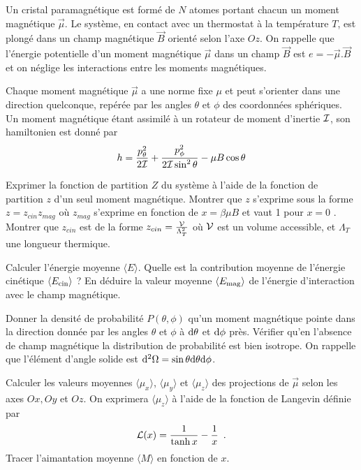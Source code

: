 Un cristal paramagnétique est formé de $N$ atomes portant chacun un moment magnétique $\overrightarrow{\mu}$. Le système, en contact avec un thermostat à la température $T$, est plongé dans un champ magnétique $\overrightarrow{B}$ orienté selon l'axe $Oz$.  On rappelle que l'énergie potentielle d'un moment magnétique $\overrightarrow{\mu}$ dans un champ $\overrightarrow{B}$ est $e=-\overrightarrow{\mu}.\overrightarrow{B}$ et on néglige les interactions entre les moments magnétiques.

\medskip


Chaque moment magnétique $\overrightarrow{\mu}$ a une norme fixe $\mu$ et peut s'orienter dans une direction quelconque, repérée par les angles $\theta$ et $\phi$ des coordonnées sphériques. Un moment magnétique étant assimilé à un rotateur de moment d'inertie $\cal I$, son hamiltonien est donné par
$$
h=\frac{p_{\theta}^2}{2 {\cal I}} + \frac{p_{\phi}^2}{2 {\cal I}\sin^{2} \theta} -\mu B \cos \theta
$$

\question
Exprimer la fonction de partition $Z$ du système à l'aide de la fonction de partition $z$ d'un seul moment magnétique. Montrer que $z$ s'exprime sous la forme $z=z_{cin}z_{mag}$ où $z_{mag}$ s'exprime en fonction de $x=\beta \mu B$ et vaut 1 pour $x=0$ . Montrer que $z_{cin}$ est de la forme $z_{cin}=\frac{\cal V}{\Lambda_T^2}$ où $\cal V$ est un \og volume accessible\fg, et $\Lambda_T$ une longueur  thermique.

\question
Calculer l'énergie moyenne $\langle E \rangle$. Quelle est la contribution moyenne de l'énergie cinétique $\langle E_{\rm cin} \rangle$ ? En déduire la valeur moyenne $\langle E_{\rm mag}\rangle $ de l'énergie d'interaction avec le champ magnétique.

\question
Donner la densité de probabilité $P(\theta, \phi)$ qu'un moment magnétique pointe dans la direction donnée par les angles $\theta$ et $\phi$ à ${\rm d}\theta$ et ${\rm d}\phi$ près. Vérifier qu'en l'absence de champ magnétique la distribution de probabilité est bien isotrope. On rappelle que l'élément d'angle solide est ${\rm d}^2 \Omega= \sin \theta {\rm d} \theta {\rm d} \phi$.

\question
Calculer les valeurs moyennes $\langle \mu_x \rangle$, $\langle \mu_y \rangle$ et $\langle \mu_z \rangle$ des projections de $\overrightarrow{\mu}$ selon les axes $Ox, Oy$ et $Oz$. On exprimera $\langle \mu_z \rangle$ à l'aide de la fonction de Langevin définie par
$$
{\cal L}(x)=\frac{1}{\tanh x}-\frac{1}{x}\enspace.
$$
Tracer l'aimantation moyenne $\langle M \rangle$ en fonction de $x$.


